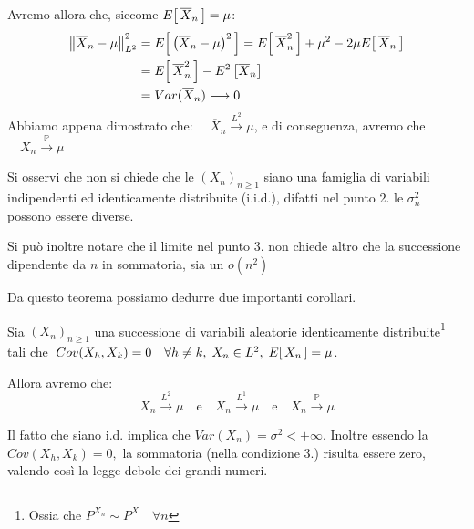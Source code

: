 \begin{teorema}
\begin{dimostrazione}
        \medskip
        \noindent Avremo allora che, siccome $E\!\left[\,\overline{X}_n\,\right] = \mu$:
        \begin{align*}
            \left\|\overline{X}_n - \mu\right\|_{L^2}^2 & = E\!\left[\,\left(\overline{X}_n - \mu\right)^2\,\right] = E\!\left[\,\overline{X}_n^2\,\right] + \mu^2 - 2\mu E\!\left[\,\overline{X}_n\,\right]\\
            & = E\!\left[\,\overline{X}_n^2\,\right] - E^2\left[\overline{X}_n\right]\\
            & = Var(\overline{X}_n) \longrightarrow 0
        \end{align*}
        Abbiamo appena dimostrato che: $\quad \overline{X}_n \overset{L^2}{\longrightarrow}\mu$, e di conseguenza, avremo che $\quad \overline{X}_n \overset{\mathbb P}{\longrightarrow}\mu$ 
    \end{dimostrazione}
\end{teorema}

Si osservi che non si chiede che le $(X_n)_{n\geq1}$ siano una famiglia di variabili indipendenti ed identicamente distribuite (i.i.d.), difatti nel punto 2. le $\sigma_n^2$ possono essere diverse.

\medskip
\noindent Si può inoltre notare che il limite nel punto 3. non chiede altro che la successione dipendente da $n$ in sommatoria, sia un $o(n^2)$

\bigskip
\noindent Da questo teorema possiamo dedurre due importanti corollari.

\begin{corollario}
\label{cor:15.15}
    Sia $(X_n)_{n\geq1}$ una successione di variabili aleatorie identicamente distribuite\footnote{Ossia che $P^{X_n}\sim P^{X}\quad \forall n$} tali che $\;Cov(X_h, X_k) = 0\quad \forall h\neq k, \; X_n\in L^2, \;E\!\left[\,X_n\,\right] = \mu$. 

    \medskip Allora avremo che:
    \[\overline{X}_n \overset{L^2}{\longrightarrow}\mu \quad \text{e}\quad \overline{X}_n \overset{L^1}{\longrightarrow}\mu\quad \text{e}\quad \overline{X}_n \overset{\mathbb{P}}{\longrightarrow}\mu \]
    \begin{dimostrazione}
        Il fatto che siano i.d. implica che $Var(X_n) = \sigma^2 < +\infty.$ Inoltre essendo la $Cov(X_h, X_k) = 0, $ la sommatoria (nella condizione 3.) risulta essere zero, valendo così la legge debole dei grandi numeri.
    \end{dimostrazione}
\end{corollario}

